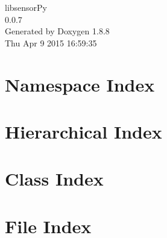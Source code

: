 \documentclass[twoside]{book}
\newcommand{\+}{\discretionary{\mbox{\scriptsize$\hookleftarrow$}}{}{}}
\newcommand{\clearemptydoublepage}{%
  \newpage{\pagestyle{empty}\cleardoublepage}%
}
\begin{document}
\hypersetup{pageanchor=false,
             bookmarks=true,
             bookmarksnumbered=true,
             pdfencoding=unicode
            }
\begin{titlepage}
\vspace*{7cm}
\begin{center}%
{\Large libsensor\+Py \\[1ex]\large 0.\+0.\+7 }\\
\vspace*{1cm}
{\large Generated by Doxygen 1.8.8}\\
\vspace*{0.5cm}
{\small Thu Apr 9 2015 16:59:35}\\
\end{center}
\end{titlepage}
\clearemptydoublepage
\tableofcontents
\clearemptydoublepage
{}
\hypersetup{pageanchor=true}

\chapter{Namespace Index}

\chapter{Hierarchical Index}

\chapter{Class Index}

\chapter{File Index}

\end{document}
